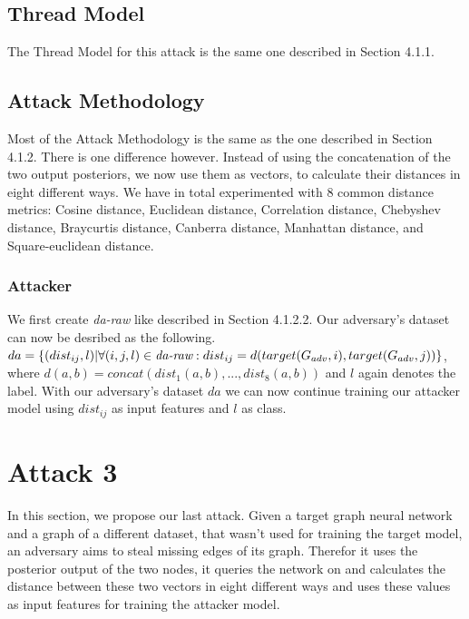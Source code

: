     \subsection{Thread Model}

      The Thread Model for this attack is the same one described in Section 4.1.1.

    \subsection{Attack Methodology}

      Most of the Attack Methodology is the same as the one described in Section 4.1.2.
      There is one difference however.
      Instead of using the concatenation of the two output posteriors, we now use them as vectors, to calculate their distances in eight different ways.
      We have in total experimented with 8 common distance metrics: Cosine distance, Euclidean distance, Correlation distance, Chebyshev distance, Braycurtis distance, Canberra distance, Manhattan distance, and Square-euclidean distance.

      \subsubsection{Attacker}

        We first create \emph{da-raw} like described in Section 4.1.2.2.
        Our adversary's dataset can now be desribed as the following.
        $da = \{(dist_{ij}, l) | \forall (i,j,l)\in\emph{da-raw}: dist_{ij} = d(target(G_{adv}, i), target(G_{adv}, j))\}$, where $d(a,b) = concat(dist_1(a,b), ..., dist_8(a,b))$ and $l$ again denotes the label.
        With our adversary's dataset $da$ we can now continue training our attacker model using $dist_{ij}$ as input features and $l$ as class.

  \section{Attack 3}

    In this section, we propose our last attack. Given a target graph neural network and a graph of a different dataset, that wasn't used for training the target model, an adversary aims to steal missing edges of its graph.
    Therefor it uses the posterior output of the two nodes, it queries the network on and calculates the distance between these two vectors in eight different ways and uses these values as input features for training the attacker model.

